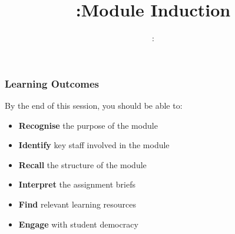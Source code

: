 \usepackage{../../beamerthemeFalmouthGamesAcademy}
\usepackage{multimedia}
\graphicspath{ {../../} }

\usepackage{textcomp}


\usepackage[normalem]{ulem}
\usepackage{wasysym}

\usepackage{pdfpages}

\usetikzlibrary{arrows,automata}







\title{\sessionnumber:Module Induction}
\subtitle{\modulecode: \moduletitle}

\frame{\titlepage} 

\begin{frame}
	\frametitle{Learning Outcomes}
	
	By the end of this session, you should be able to:
	
	\begin{itemize}
		\item \textbf{Recognise} the purpose of the module
		\item \textbf{Identify} key staff involved in the module
		\item \textbf{Recall} the structure of the module
		\item\textbf{Interpret} the assignment briefs
		\item \textbf{Find} relevant learning resources
		\item \textbf{Engage} with student democracy		
	\end{itemize}
\end{frame}

